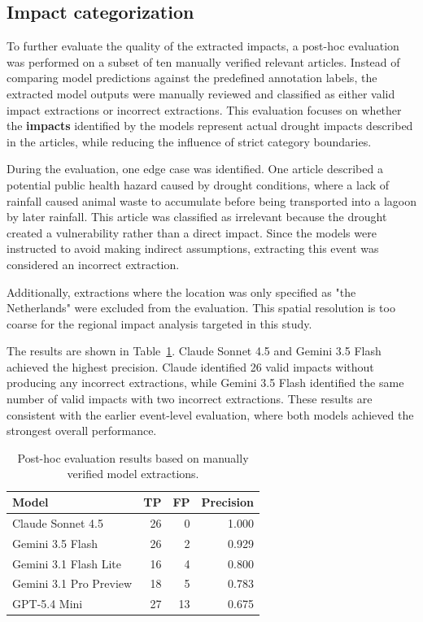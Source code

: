 

\subsection{Impact categorization}
To further evaluate the quality of the extracted impacts, a post-hoc evaluation was performed on a subset of ten manually verified relevant articles. Instead of comparing model predictions against the predefined annotation labels, the extracted model outputs were manually reviewed and classified as either valid impact extractions or incorrect extractions. This evaluation focuses on whether the \textbf{impacts} identified by the models represent actual drought impacts described in the articles, while reducing the influence of strict category boundaries.

During the evaluation, one edge case was identified. One article described a potential public health hazard caused by drought conditions, where a lack of rainfall caused animal waste to accumulate before being transported into a lagoon by later rainfall. This article was classified as irrelevant because the drought created a vulnerability rather than a direct impact. Since the models were instructed to avoid making indirect assumptions, extracting this event was considered an incorrect extraction.

Additionally, extractions where the location was only specified as "the Netherlands" were excluded from the evaluation. This spatial resolution is too coarse for the regional impact analysis targeted in this study.

The results are shown in Table~\ref{tab:posthoc_results}. Claude Sonnet 4.5 and Gemini 3.5 Flash achieved the highest precision. Claude identified 26 valid impacts without producing any incorrect extractions, while Gemini 3.5 Flash identified the same number of valid impacts with two incorrect extractions. These results are consistent with the earlier event-level evaluation, where both models achieved the strongest overall performance.



\begin{table}[ht]
\centering
\caption{Post-hoc evaluation results based on manually verified model extractions.}\label{tab:posthoc_results}
\begin{tabular}{lrrr}
\toprule
Model & TP & FP & Precision \\
\midrule
Claude Sonnet 4.5      & 26 & 0  & 1.000 \\
Gemini 3.5 Flash       & 26 & 2  & 0.929 \\
Gemini 3.1 Flash Lite  & 16 & 4  & 0.800 \\
Gemini 3.1 Pro Preview & 18 & 5  & 0.783 \\
GPT-5.4 Mini           & 27 & 13 & 0.675 \\
\bottomrule
\end{tabular}
\end{table}















